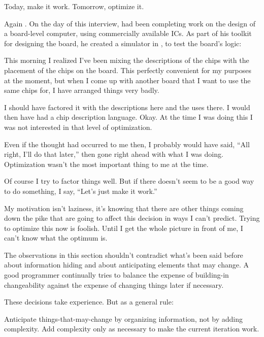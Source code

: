 \begin{tip}
Today, make it work. Tomorrow, optimize it.
\end{tip}
\begin{interview}
Again . On the day of this
interview,  had been completing work on the design of a
board-level \Forth{} computer, using commercially available ICs. As
part of his toolkit for designing the board, he created a simulator in
\Forth{}, to test the board's logic:

\begin{tfquot}
This morning I realized I've been mixing the descriptions of the chips
with the placement of the chips on the board. This perfectly
convenient for my purposes at the moment, but when I come up with
another board that I want to use the same chips for, I have arranged
things very badly.

I should have factored it with the descriptions here and the uses
there. I would then have had a chip description language. Okay. At the
time I was doing this I was not interested in that level of
optimization.

Even if the thought had occurred to me then, I probably would have
said, ``All right, I'll do that later,'' then gone right ahead with
what I was doing. Optimization wasn't the most important thing to me
at the time.

Of course I try to factor things well. But if there doesn't seem to be
a good way to do something, I say, ``Let's just make it work.''

My motivation isn't laziness, it's knowing that there are other things
coming down the pike that are going to affect this decision in ways I
can't predict. Trying to optimize this now is foolish. Until I get the
whole picture in front of me, I can't know what the optimum is.
\end{tfquot}
\end{interview}
The observations in this section shouldn't contradict what's been said
before about information hiding and about anticipating elements that
may change. A good programmer continually tries to balance the expense
of building-in changeability against the expense of changing things
later if necessary.

These decisions take experience. But as a general rule:

\begin{tip}
Anticipate things-that-may-change by organizing information, not by
adding complexity. Add complexity only as necessary to make the
current iteration work.
\end{tip}

